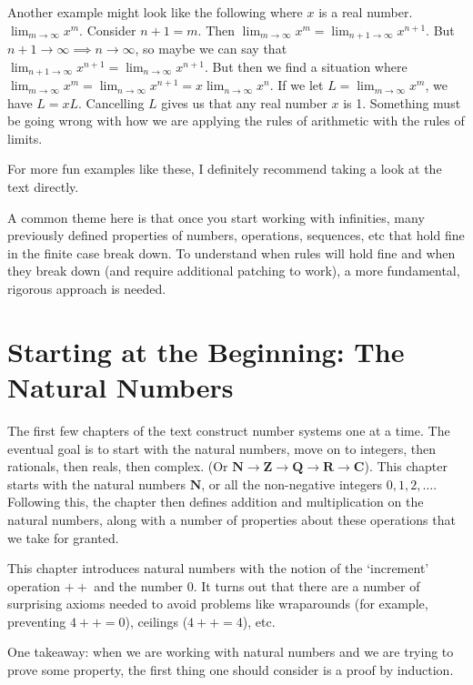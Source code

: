 \documentclass[answers,12pt]{exam}
\begin{document}
Another example might look like the following where $x$ is a real number.
$\lim_{m \rightarrow \infty} x^m$.
Consider $n+1 = m$.
Then $\lim_{m \rightarrow \infty} x^m = \lim_{n+1 \rightarrow \infty} x^{n+1}$.
But $n+1 \rightarrow \infty \implies n \rightarrow \infty$, so maybe we can say that $\lim_{n+1 \rightarrow \infty} x^{n+1} = \lim_{n \rightarrow \infty} x^{n+1}$.
But then we find a situation where $\lim_{m \rightarrow \infty} x^m =  \lim_{n \rightarrow \infty} x^{n+1} = x \lim_{n \rightarrow \infty} x^{n}$.
If we let $L = \lim_{m \rightarrow \infty} x^m $, we have $L = xL$.
Cancelling $L$ gives us that any real number $x$ is 1.
Something must be going wrong with how we are applying the rules of arithmetic with the rules of limits.

For more fun examples like these, I definitely recommend taking a look at the text directly.

A common theme here is that once you start working with infinities, many previously defined properties of numbers, operations, sequences, etc that hold fine in the finite case break down. 
To understand when rules will hold fine and when they break down (and require additional patching to work), a more fundamental, rigorous approach is needed.

\section{Starting at the Beginning: The Natural Numbers}
The first few chapters of the text construct number systems one at a time.
The eventual goal is to start with the natural numbers, move on to integers, then rationals, then reals, then complex. 
(Or $\mathbf{N} \rightarrow \mathbf{Z} \rightarrow \mathbf{Q} \rightarrow \mathbf{R} \rightarrow \mathbf{C}$). 
This chapter starts with the natural numbers $\mathbf{N}$, or all the non-negative integers $0, 1, 2, \dots$. 
Following this, the chapter then defines addition and multiplication on the natural numbers, along with a number of properties about these operations that we take for granted.

This chapter introduces natural numbers with the notion of the `increment' operation $++$ and the number 0.
It turns out that there are a number of surprising axioms needed to avoid problems like wraparounds (for example, preventing $4++ = 0$), ceilings ($4++ = 4$), etc.

One takeaway: when we are working with natural numbers and we are trying to prove some property, the first thing one should consider is a proof by induction.
\end{document}
